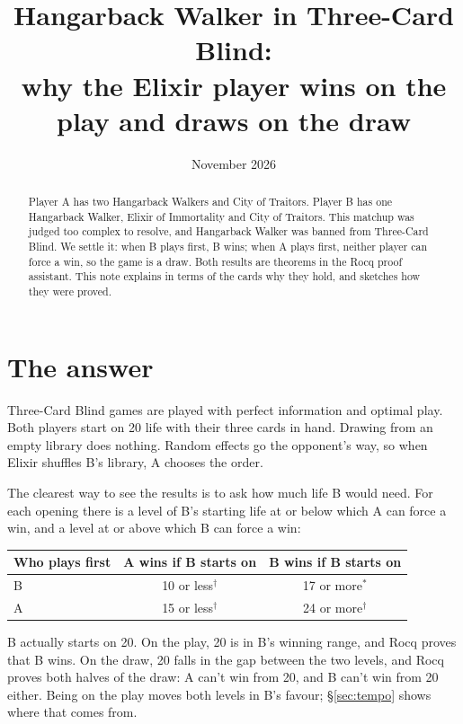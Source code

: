 \documentclass[11pt]{article}
\title{Hangarback Walker in Three-Card Blind:\\
  why the Elixir player wins on the play and draws on the draw}
\author{}
\date{November 2026}
\newcommand{\Walker}{Hangarback Walker}
\begin{document}
\maketitle

\begin{abstract}
\noindent
Player A has two \Walker{}s and City of Traitors. Player B has one
\Walker, Elixir of Immortality and City of Traitors. This matchup was
judged too complex to resolve, and \Walker{} was banned from Three-Card
Blind. We settle it: when B plays first, B wins; when A plays first,
neither player can force a win, so the game is a draw. Both results are
theorems in the Rocq proof assistant. This note explains in terms of the
cards why they hold, and sketches how they were proved.
\end{abstract}

\section{The answer}

Three-Card Blind games are played with perfect information and optimal
play. Both players start on 20 life with their three cards in hand. Drawing
from an empty library does nothing. Random effects go the opponent's way,
so when Elixir shuffles B's library, A chooses the order.

The clearest way to see the results is to ask how much life B would need.
For each opening there is a level of B's starting life at or below which
A can force a win, and a level at or above which B can force a win:

\begin{center}
\begin{tabular}{lcc}
\toprule
Who plays first & A wins if B starts on & B wins if B starts on \\
\midrule
B & 10 or less$^{\dagger}$ & 17 or more$^{*}$ \\
A & 15 or less$^{\dagger}$ & 24 or more$^{\dagger}$ \\
\bottomrule
\end{tabular}
\end{center}

\noindent
B actually starts on 20. On the play, 20 is in B's winning range, and
Rocq proves that B wins. On the draw, 20 falls in the gap between the two
levels, and Rocq proves both halves of the draw: A can't win from 20, and
B can't win from 20 either. Being on the play moves both levels in B's
favour; \S\ref{sec:tempo} shows where that comes from.
\end{document}

